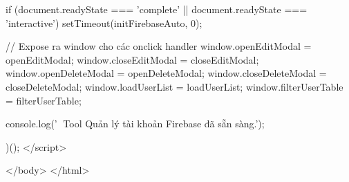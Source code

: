 {            if (document.readyState === 'complete' || document.readyState === 'interactive') {
                setTimeout(initFirebaseAuto, 0);
            }

            // Expose ra window cho các onclick handler
            window.openEditModal = openEditModal;
            window.closeEditModal = closeEditModal;
            window.openDeleteModal = openDeleteModal;
            window.closeDeleteModal = closeDeleteModal;
            window.loadUserList = loadUserList;
            window.filterUserTable = filterUserTable;

            console.log('🔧 Tool Quản lý tài khoản Firebase đã sẵn sàng.');

        })();
    </script>

</body>
</html>